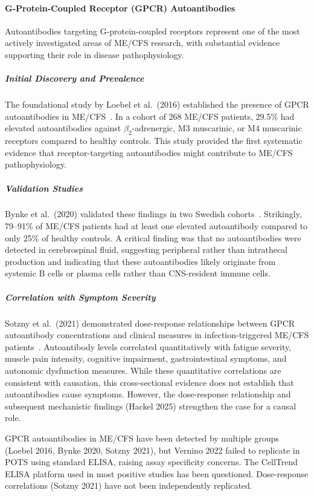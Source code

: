 \paragraph{G-Protein-Coupled Receptor (GPCR) Autoantibodies}
Autoantibodies targeting G-protein-coupled receptors represent one of the most actively investigated areas of ME/CFS research, with substantial evidence supporting their role in disease pathophysiology.

\subparagraph{Initial Discovery and Prevalence}
The foundational study by Loebel et al.\ (2016) established the presence of GPCR autoantibodies in ME/CFS~\cite{Loebel2016}. In a cohort of 268 ME/CFS patients, 29.5\% had elevated autoantibodies against $\beta_2$-adrenergic, M3 muscarinic, or M4 muscarinic receptors compared to healthy controls. This study provided the first systematic evidence that receptor-targeting autoantibodies might contribute to ME/CFS pathophysiology.

\subparagraph{Validation Studies}
Bynke et al.\ (2020) validated these findings in two Swedish cohorts~\cite{Bynke2020}. Strikingly, 79--91\% of ME/CFS patients had at least one elevated autoantibody compared to only 25\% of healthy controls. A critical finding was that no autoantibodies were detected in cerebrospinal fluid, suggesting peripheral rather than intrathecal production and indicating that these autoantibodies likely originate from systemic B cells or plasma cells rather than CNS-resident immune cells.

\subparagraph{Correlation with Symptom Severity}

\begin{achievement}
\label{ach:gpcr-correlation}
Sotzny et al.\ (2021) demonstrated dose-response relationships between GPCR autoantibody concentrations and clinical measures in infection-triggered ME/CFS patients~\cite{Sotzny2021}. Autoantibody levels correlated quantitatively with fatigue severity, muscle pain intensity, cognitive impairment, gastrointestinal symptoms, and autonomic dysfunction measures. While these quantitative correlations are consistent with causation, this cross-sectional evidence does not establish that autoantibodies cause symptoms. However, the dose-response relationship and subsequent mechanistic findings (Hackel 2025) strengthen the case for a causal role.
\end{achievement}

\begin{warning}
GPCR autoantibodies in ME/CFS have been detected by multiple groups (Loebel 2016, Bynke 2020, Sotzny 2021), but Vernino 2022 failed to replicate in POTS using standard ELISA, raising assay specificity concerns. The CellTrend ELISA platform used in most positive studies has been questioned. Dose-response correlations (Sotzny 2021) have not been independently replicated.
\end{warning}

